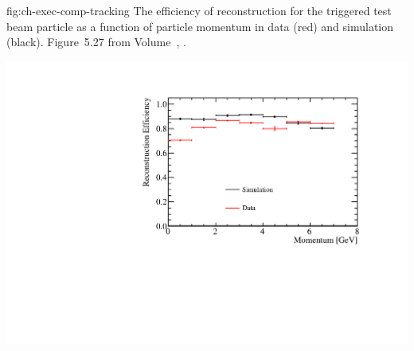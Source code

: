 \begin{dunefigure}
{fig:ch-exec-comp-tracking}
{The efficiency of reconstruction for the triggered test beam particle as a function of particle
momentum in data (red) and simulation (black). Figure~5.27 from Volume~\volnumberphysics{}, \voltitlephysics{}.}
\includegraphics[height=4in]{graphics/BeamParticleEfficiencyVsMomentum.pdf}
\end{dunefigure}






